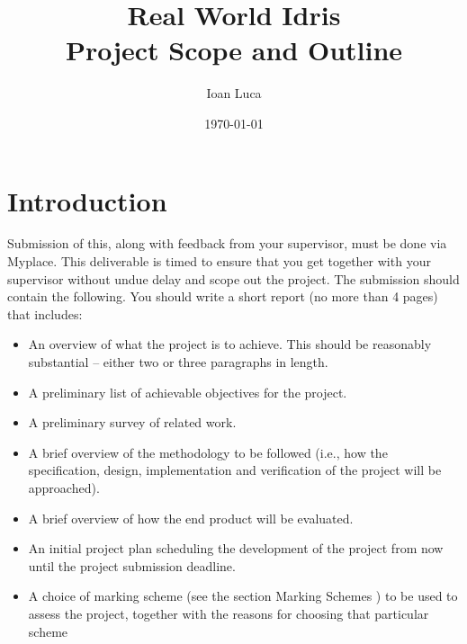 \documentclass[a4paper]{report}
\begin{document}
\title{Real World Idris \\ Project Scope and Outline}
\author{Ioan Luca}
\date{\today}
\maketitle


\tableofcontents




\chapter{Introduction}
	Submission of this, along with feedback from your supervisor, must be done
	via Myplace.
	This deliverable is timed to ensure that you get together with your
	supervisor without undue delay and scope out the project.
	The submission should contain the following.
	You should write a short report (no more than 4 pages) that includes:
	\begin{itemize}
		\item An overview of what the project is to achieve. This should be reasonably substantial
		      – either two or three paragraphs in length.
		\item A preliminary list of achievable objectives for the project.
		\item A preliminary survey of related work.
		\item A brief overview of the methodology to be followed
		      (i.e., how the specification, design, implementation and verification
		      of the project will be approached).
		\item A brief overview of how the end product will be evaluated.
		\item An initial project plan scheduling the development of the project from now until the
		      project submission deadline.
		\item A choice of marking scheme (see the section Marking Schemes ) to be used to assess the
		      project, together with the reasons for choosing that particular scheme
	\end{itemize}
\end{document}
